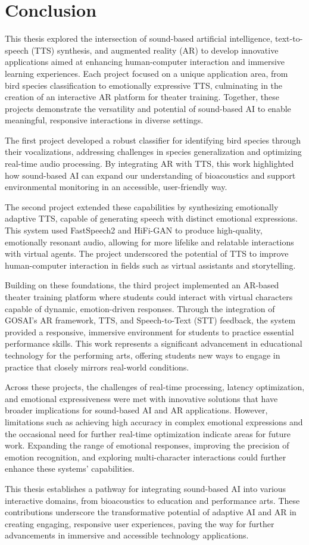 \section{Conclusion}
This thesis explored the intersection of sound-based artificial intelligence, text-to-speech (TTS) synthesis, and augmented reality (AR) to develop innovative applications aimed at enhancing human-computer interaction and immersive learning experiences. Each project focused on a unique application area, from bird species classification to emotionally expressive TTS, culminating in the creation of an interactive AR platform for theater training. Together, these projects demonstrate the versatility and potential of sound-based AI to enable meaningful, responsive interactions in diverse settings.

The first project developed a robust classifier for identifying bird species through their vocalizations, addressing challenges in species generalization and optimizing real-time audio processing. By integrating AR with TTS, this work highlighted how sound-based AI can expand our understanding of bioacoustics and support environmental monitoring in an accessible, user-friendly way.

The second project extended these capabilities by synthesizing emotionally adaptive TTS, capable of generating speech with distinct emotional expressions. This system used FastSpeech2 and HiFi-GAN to produce high-quality, emotionally resonant audio, allowing for more lifelike and relatable interactions with virtual agents. The project underscored the potential of TTS to improve human-computer interaction in fields such as virtual assistants and storytelling.

Building on these foundations, the third project implemented an AR-based theater training platform where students could interact with virtual characters capable of dynamic, emotion-driven responses. Through the integration of GOSAI’s AR framework, TTS, and Speech-to-Text (STT) feedback, the system provided a responsive, immersive environment for students to practice essential performance skills. This work represents a significant advancement in educational technology for the performing arts, offering students new ways to engage in practice that closely mirrors real-world conditions.

Across these projects, the challenges of real-time processing, latency optimization, and emotional expressiveness were met with innovative solutions that have broader implications for sound-based AI and AR applications. However, limitations such as achieving high accuracy in complex emotional expressions and the occasional need for further real-time optimization indicate areas for future work. Expanding the range of emotional responses, improving the precision of emotion recognition, and exploring multi-character interactions could further enhance these systems’ capabilities.

This thesis establishes a pathway for integrating sound-based AI into various interactive domains, from bioacoustics to education and performance arts. These contributions underscore the transformative potential of adaptive AI and AR in creating engaging, responsive user experiences, paving the way for further advancements in immersive and accessible technology applications.